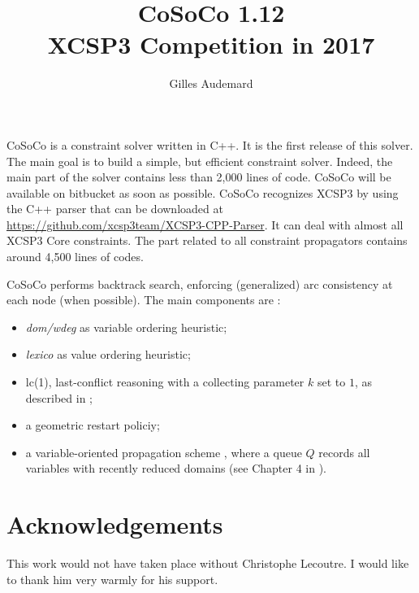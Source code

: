 \documentclass{llncs}
\newcommand{\h}[1]{\textit{#1}} %
\begin{document}
\pagestyle{empty}


\title{CoSoCo 1.12\\ {\small XCSP3 Competition in 2017}}

\author{Gilles Audemard}



\maketitle




\bigskip\bigskip\bigskip CoSoCo is a constraint solver written in
C++. It is the first release of this solver. The main goal is to build
a simple, but efficient constraint solver. Indeed, the main part of
the solver contains less than 2,000 lines of code. CoSoCo will be
available on bitbucket as soon as possible. CoSoCo recognizes XCSP3
\cite{BLPP_xcsp3} by using the C++ parser that can be downloaded at
\href{https://github.com/xcsp3team/XCSP3-CPP-Parser}{https://github.com/xcsp3team/XCSP3-CPP-Parser}. It
can deal with almost all XCSP3 Core constraints. The part related to
all constraint propagators contains around 4,500 lines of codes.



\bigskip
CoSoCo performs backtrack search, enforcing (generalized) arc consistency at each node (when possible).  
The main components are :
\begin{itemize}
\item \h{dom/wdeg} \cite{BHLS_boosting} as variable ordering heuristic;
\item \h{lexico} as value ordering heuristic;
\item lc(1), last-conflict reasoning with a collecting parameter $k$ set to $1$, as described in \cite{LSTV_reasonning};
\item a geometric restart policiy;
\item a variable-oriented propagation scheme \cite{G_relational}, where a queue $Q$ records all variables with recently reduced domains (see Chapter 4 in \cite{L_constraint}).
\end{itemize}
  


\section*{Acknowledgements}
This work would not have taken place without Christophe
Lecoutre. I  would like to thank him  very warmly for his support.



\end{document}
